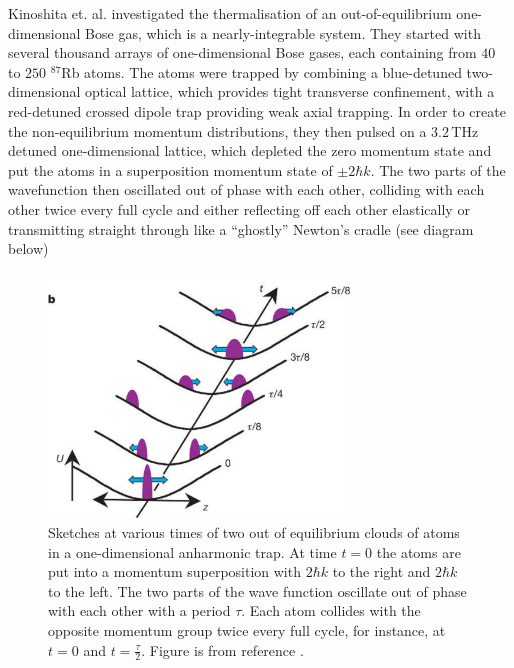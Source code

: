 \documentclass[a4paper, 10pt]{article}
\theoremstyle{plain}
\begin{document}
Kinoshita et. al. investigated \cite{Kinoshita2006} the thermalisation of an
out-of-equilibrium one-dimensional Bose gas, which is a  nearly-integrable
system. They started with several thousand arrays of one-dimensional Bose gases,
each containing from $40$ to $250$ $^{87}$Rb atoms. The atoms were trapped by
combining a blue-detuned  two-dimensional optical lattice,
which provides tight transverse confinement, with a red-detuned crossed dipole
trap providing weak axial trapping. In order to create the non-equilibrium
momentum distributions, they then pulsed on a $3.2$\,THz detuned one-dimensional
lattice, which depleted the zero momentum state and put the atoms in a
superposition momentum state of $\pm2\hbar k$. The two parts of the wavefunction
then oscillated out of phase with each other, colliding with each other twice
every full cycle and either reflecting off each other elastically or
transmitting straight through like a ``ghostly'' Newton's cradle (see diagram
below)
\begin{figure}[H]
    \begin{center}
        \includegraphics[width=8cm]{quantum_newtons_cradle}
    \end{center}
    \caption{Sketches at various times of two out of equilibrium clouds of atoms
             in a one-dimensional anharmonic trap. At time $t=0$ the atoms are
             put into a momentum superposition with $2\hbar k$ to the right and
             $2 \hbar k$ to the left. The two parts of the wave function
             oscillate out of phase with each other with a period $\tau$. Each
             atom collides with the opposite momentum group twice every full
             cycle, for instance, at $t=0$ and $t = \frac{\tau}{2}$. Figure is
             from reference \cite{Kinoshita2006}.}
\end{figure}
\end{document}
